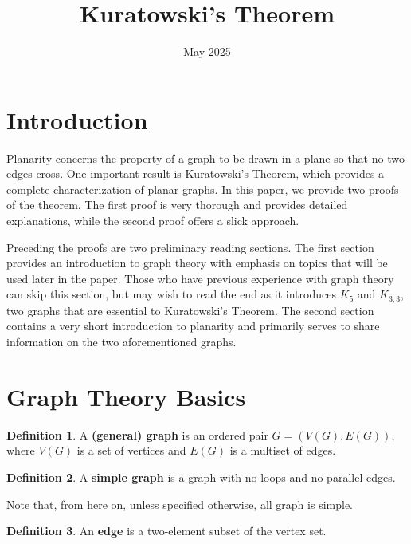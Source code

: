 \documentclass[12pt]{article}
\title{Kuratowski's Theorem}
\author{}
\date{May 2025}
\theoremstyle{definition}
\newtheorem{defn}{Definition}[section]
\begin{document}
\maketitle

\section{Introduction}

    Planarity concerns the property of a graph to be drawn in a plane so that no two edges cross. One important result is Kuratowski's Theorem, which provides a complete characterization of planar graphs. In this paper, we provide two proofs of the theorem. The first proof is very thorough and provides detailed explanations, while the second proof offers a slick approach.

    Preceding the proofs are two preliminary reading sections. The first section provides an introduction to graph theory with emphasis on topics that will be used later in the paper. Those who have previous experience with graph theory can skip this section, but may wish to read the end as it introduces $K_5$ and $K_{3,3}$, two graphs that are essential to Kuratowski's Theorem. The second section contains a very short introduction to planarity and primarily serves to share information on the two aforementioned graphs.

\section{Graph Theory Basics}

\begin{bluebox}
    \begin{defn}
    A \textbf{(general) graph} is an ordered pair $G = (V(G), E(G))$,  where $V(G)$ is a set of vertices and $E(G)$ is a multiset of edges.
\end{defn}
\end{bluebox}

\begin{bluebox}
    \begin{defn}
    A \textbf{simple graph} is a graph with no loops and no parallel edges.
\end{defn}
\end{bluebox}

Note that, from here on, unless specified otherwise, all graph is simple.

\begin{bluebox}
    \begin{defn}
    An \textbf{edge} is a two-element subset of the vertex set.
\end{defn}
\end{bluebox}
\end{document}
